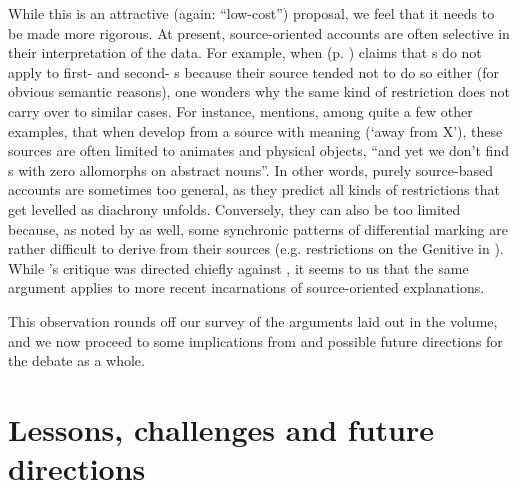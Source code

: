 \documentclass[output=paper]{langsci/langscibook}
\begin{document}
While this is an attractive (again: “low-cost”) proposal, we feel that it needs to be made more rigorous. At present, source-oriented accounts are often selective in their interpretation of the data. For example, when  (p. \pageref{p:cristofaro:ergatives}) claims that s do not apply to first- and second- s because their  source tended not to do so either (for obvious semantic reasons), one wonders why the same kind of restriction does not carry over to similar cases. For instance, \citet[36]{Kiparsky2008} mentions, among quite a few other examples, that when  develop from a source with  meaning (‘away from X’), these sources are often limited to animates and physical objects, “and yet we don't find s with zero allomorphs on abstract nouns”. In other words, purely source-based accounts are sometimes too general, as they predict all kinds of restrictions that get levelled as diachrony unfolds. Conversely, they can also be too limited because, as noted by \citet{Kiparsky2008} as well, some synchronic patterns of differential marking are rather difficult to derive from their sources (e.g.  restrictions on the Genitive in ). While ’s critique was directed chiefly against \citet{Garrett1990}, it seems to us that the same argument applies to more recent incarnations of source-oriented explanations.

\largerpage[2]
This observation rounds off our survey of the arguments laid out in the volume, and we now proceed to some implications from and possible future directions for the debate as a whole.

\section{Lessons, challenges and future directions}\label{sec:epilogue:2}
\end{document}
